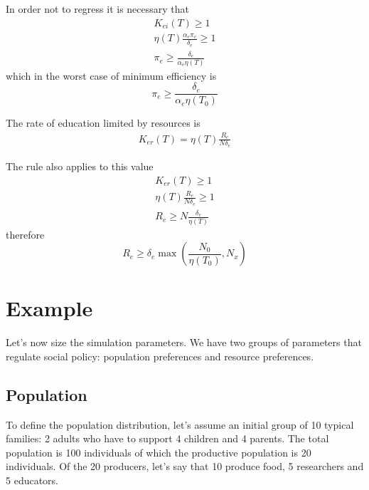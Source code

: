 \documentclass[a4paper,twoside]{article}
\begin{document}
In order not to regress it is necessary that
\begin{align*}
	K_{ei}(T) \ge 1
	\\
	\eta(T) \frac{\alpha_e \pi_e}{\delta_e} \ge 1
	\\
	\pi_e \ge \frac{\delta_e}{\alpha_e \eta(T)}
\end{align*}
which in the worst case of minimum efficiency is
\begin{equation}\label{eq:pie}
	\pi_e \ge \frac{\delta_e}{\alpha_e \eta(T_0)}
\end{equation}

The rate of education limited by resources is
\begin{align*}
	K_{er}(T) = \eta(T) \frac{R_e}{N \delta_e}
\end{align*}

The rule also applies to this value
\begin{align*}
	K_{er}(T) \ge 1
	\\
	\eta(T) \frac{R_e}{N \delta_e} \ge 1
	\\
	R_e \ge N \frac{\delta_e}{\eta(T)}
\end{align*}
therefore
\begin{equation}\label{eq:Re}
	R_e \ge \delta_e \max \left( \frac{N_0}{\eta(T_0)}, N_x \right)
\end{equation}

\section{Example}

Let's now size the simulation parameters.
We have two groups of parameters that regulate social policy: population preferences and resource preferences.

\subsection{Population}

To define the population distribution, let's assume an initial group of 10 typical families: 2 adults who have to support 4 children and 4 parents.
The total population is 100 individuals of which the productive population is 20 individuals.
Of the 20 producers, let's say that 10 produce food, 5 researchers and 5 educators.
\end{document}
